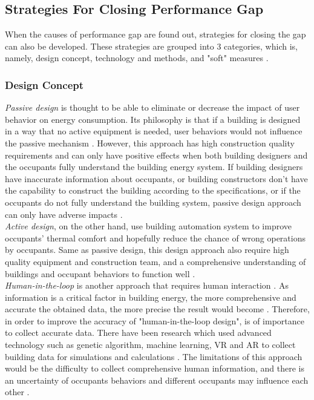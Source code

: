 \documentclass[11pt, a4paper]{article}
\theoremstyle{definition}
\begin{document}
	\subsection{Strategies For Closing Performance Gap} 
		When the causes of performance gap are found out, strategies for closing the gap can also be developed. These strategies are grouped into 3 categories, which is, namely, design concept, technology and methods, and "soft" measures \cite{ZOU2018165}.\\

		\subsubsection{Design Concept}
			\textit{Passive design} is thought to be able to eliminate or decrease the impact of user behavior on energy consumption. Its philosophy is that if a building is designed in a way that no active equipment is needed, user behaviors would not influence the passive mechanism \cite{BLIGHT2013183,NORFORD1994121}. However, this approach has high construction quality requirements and can only have positive effects when both building designers and the occupants fully understand the building energy system. If building designers have inaccurate information about occupants, or building constructors don't have the capability to construct the building according to the specifications, or if the occupants do not fully understand the building system, passive design approach can only have adverse impacts \cite{ZOU2018165}.\\

			\textit{Active design}, on the other hand, use building automation system to improve occupants' thermal comfort and hopefully reduce the chance of wrong operations by occupants. Same as passive design, this design approach also require high quality equipment and construction team, and a comprehensive understanding of buildings and occupant behaviors to function well \cite{DEWILDE201440}.\\

			\textit{Human-in-the-loop} is another approach that requires human interaction \cite{karwowski2001international}. As information is a critical factor in building energy, the more comprehensive and accurate the obtained data, the more precise the result would become \cite{NIU2016275}. Therefore, in order to improve the accuracy of "human-in-the-loop design", is of importance to collect accurate data. There have been research which used advanced technology such as genetic algorithm, machine learning, VR and AR to collect building data for simulations and calculations \cite{karwowski2001international}. The limitations of this approach would be the difficulty to collect comprehensive human information, and there is an uncertainty of occupants behaviors and different occupants may influence each other \cite{masoso2010dark}.
\end{document}
